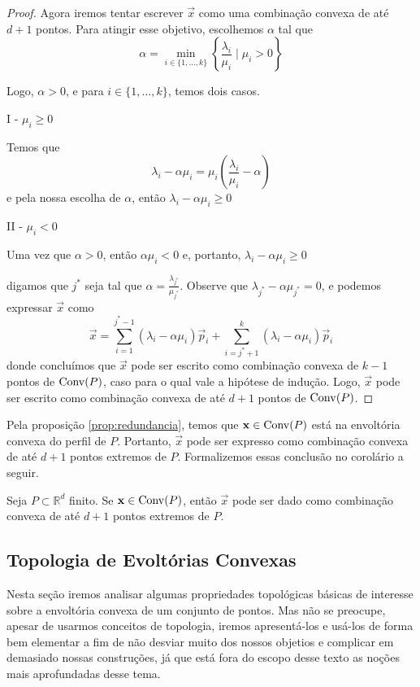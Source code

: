 \begin{thm:caratheodory}[Carathéodory]
\begin{proof}
		Agora iremos tentar escrever $\vec x$ como uma combinação convexa de até $d + 1$ pontos.
		Para atingir esse objetivo, escolhemos $\alpha$ tal que
	    \[
	      \alpha = \min_{i \in \{1, \dots, k\}} \left\{\frac{\lambda_i}{\mu_i} \mid  \mu_i > 0\right\}
	    \]

		Logo, $\alpha > 0$, e para $i \in \{1, \ldots, k\}$, temos dois casos.

		I - $\mu_i \geq 0$

		Temos que
		\[\lambda_i - \alpha \mu_i = \mu_i \left(\frac{\lambda_i}{\mu_i} - \alpha\right)\]
		e pela nossa escolha de $\alpha$, então \(\lambda_i - \alpha \mu_i \geq 0\)

		II - $\mu_i < 0$

		Uma vez que $\alpha > 0$, então $\alpha \mu_i < 0$ e, portanto,
		\(\lambda_i - \alpha \mu_i \geq 0\)

		digamos que $j^*$ seja tal que $\alpha = \frac{\lambda_{j^*}}{\mu_{j^*}}$. Observe que
		$\lambda_{j^*} - \alpha \mu_{j^*} = 0$, e podemos expressar $\vec x$ como
		\[\vec x = \displaystyle\sum_{i=1}^{j^* - 1} (\lambda_i - \alpha \mu_i)\vec p_i +
				\displaystyle\sum_{i=j^* + 1}^{k} (\lambda_i - \alpha \mu_i)\vec p_i\]
		donde concluímos que $\vec x$ pode ser escrito como combinação convexa de $k - 1$ pontos de $\mathrm{Conv}(P)$, caso para o qual vale a hipótese de indução.
		Logo, $\vec x$ pode ser escrito como combinação convexa de até $d + 1$ pontos de $\mathrm{Conv}(P)$.
	\end{proof}
\end{thm:caratheodory}

Pela proposição \ref{prop:redundancia}, temos que $\mathbf x \in \mathrm{Conv}(P)$ está
na envoltória convexa do perfil de $P$. Portanto, $\vec x$ pode ser expresso
como combinação convexa de até $d+1$ pontos extremos de $P$. Formalizemos
essas conclusão no corolário a seguir.

\begin{cor:caratheodory}
	Seja $P \subset \mathbb{R}^d$ finito. Se $\mathbf x \in \mathrm{Conv}(P)$,
	então $\vec x$ pode ser dado como combinação convexa de até $d + 1$ pontos
	extremos de $P$.
\end{cor:caratheodory}

\subsection{Topologia de Evoltórias Convexas}

Nesta seção iremos analisar algumas propriedades topológicas básicas de
interesse sobre a envoltória convexa de um conjunto de pontos. Mas não se
preocupe, apesar de usarmos conceitos de topologia, iremos apresentá-los
e usá-los de forma bem elementar a fim de não desviar muito dos nossos
objetios e complicar em demasiado nossas construções, já que está fora do
escopo desse texto as noções mais aprofundadas desse tema.

